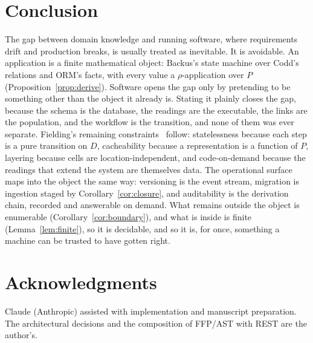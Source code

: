 \documentclass[10pt,twocolumn]{article}
\theoremstyle{plain}
\theoremstyle{definition}
\begin{document}
\section{Conclusion}

The gap between domain knowledge and running software, where requirements drift and production breaks, is usually treated as inevitable. It is avoidable. An application is a finite mathematical object: Backus's state machine over Codd's relations and ORM's facts, with every value a $\rho$-application over $P$ (Proposition~\ref{prop:derive}). Software opens the gap only by pretending to be something other than the object it already is. Stating it plainly closes the gap, because the schema is the database, the readings are the executable, the links are the population, and the workflow is the transition, and none of them was ever separate. Fielding's remaining constraints~\cite{fielding00} follow: statelessness because each step is a pure transition on $D$, cacheability because a representation is a function of $P$, layering because cells are location-independent, and code-on-demand because the readings that extend the system are themselves data. The operational surface maps into the object the same way: versioning is the event stream, migration is ingestion staged by Corollary~\ref{cor:closure}, and auditability is the derivation chain, recorded and answerable on demand. What remains outside the object is enumerable (Corollary~\ref{cor:boundary}), and what is inside is finite (Lemma~\ref{lem:finite}), so it is decidable, and so it is, for once, something a machine can be trusted to have gotten right.

\section*{Acknowledgments}

Claude (Anthropic) assisted with implementation and manuscript preparation. The architectural decisions and the composition of FFP/AST with REST are the author's.
\end{document}
